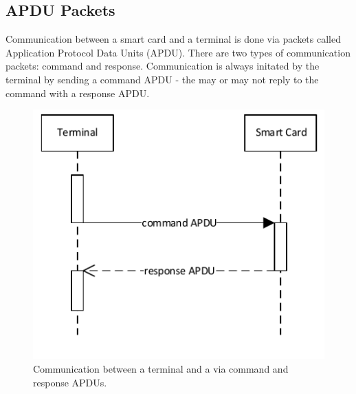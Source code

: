 \subsection{APDU Packets}
Communication between a smart card and a terminal is done via packets called Application Protocol Data Units (APDU). There are two types of communication packets: command and response. Communication is always initated by the terminal by sending a command APDU - the \jc may or may not reply to the command with a response APDU. 

\begin{figure}[h]
  \centering
  \includegraphics[scale=1, trim=0cm 0cm 0cm 0cm]{figures/apdu}
  \caption{Communication between a terminal and a \jc via command and response APDUs.}
  \label{fig:apdu}
\end{figure}
